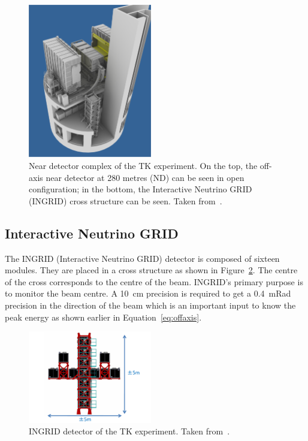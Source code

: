 \begin{figure}[ht]
  \center
  \includegraphics[width=0.48\textwidth]{images/t2k/ND280Pit.eps}
  \caption[Near detector complex]{Near detector complex of the
    \Gls{TK} experiment. On the top, the off-axis near detector at 280
    metres (\Gls{ND}) can be seen in open configuration; in the
    bottom, the Interactive Neutrino GRID (\Gls{INGRID}) cross
    structure can be seen. Taken from~\cite{T2K2011}.}
  \label{fig:pit}
\end{figure}

\subsection{Interactive Neutrino GRID}
\label{subsec:ingrid}
The \Gls{INGRID} (Interactive Neutrino GRID) detector is composed of
sixteen modules. They are placed in a cross structure as shown in
Figure~\ref{fig:INGRID}. The centre of the cross corresponds to the
centre of the beam. \Gls{INGRID}'s primary purpose is to monitor the
beam centre. A 10~cm precision is required to get a 0.4~mRad precision
in the direction of the beam which is an important input to know the
peak energy as shown earlier in Equation~\ref{eq:offaxis}.

\begin{figure}[ht]
  \center
  \includegraphics[width=0.48\textwidth]{images/t2k/ingrid.pdf}
  \caption[INGRID detector]{\Gls{INGRID} detector of the \Gls{TK}
    experiment. Taken from~\cite{T2K2011}.}
  \label{fig:INGRID}
\end{figure}

